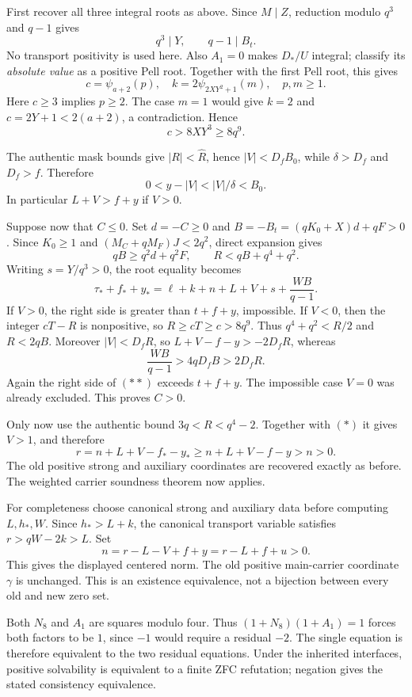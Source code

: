First recover all three integral roots as above.  Since $M\mid Z$,
reduction modulo $q^3$ and $q-1$ gives
\[
 q^3\mid Y,\qquad q-1\mid B_t.
\]
No transport positivity is used here.  Also $A_1=0$ makes $D_*/U$
integral; classify its \emph{absolute value} as a positive Pell root.
Together with the first Pell root, this gives
\[
 c=\psi_{a+2}(p),\quad k=2\psi_{2XY^2+1}(m),\quad p,m\ge1.
\]
Here $c\ge3$ implies $p\ge2$.  The case $m=1$ would give $k=2$ and
$c=2Y+1<2(a+2)$, a contradiction.  Hence
\[
 c>8XY^3\ge8q^9. \tag{*}
\]

The authentic mask bounds give $|R|<\widehat R$, hence
$|V|<D_fB_0$, while $\delta>D_f$ and $D_f>f$.  Therefore
\[
 0<y-|V|<|V|/\delta<B_0.
\]
In particular $L+V>f+y$ if $V>0$.

Suppose now that $C\le0$.  Set $d=-C\ge0$ and
$B=-B_t=(qK_0+X)d+qF>0$.  Since $K_0\ge1$ and
$(M_C+qM_F)J<2q^2$, direct expansion gives
\[
 qB\ge q^2d+q^2F,\qquad R<qB+q^4+q^2.
\]
Writing $s=Y/q^3>0$, the root equality becomes
\[
 \tau_*+f_*+y_*=
 \ell+k+n+L+V+s+\frac{WB}{q-1}. \tag{**}
\]
If $V>0$, the right side is greater than $t+f+y$, impossible.
If $V<0$, then the integer $cT-R$ is nonpositive, so
$R\ge cT\ge c>8q^9$.  Thus $q^4+q^2<R/2$ and $R<2qB$.
Moreover $|V|<D_fR$, so $L+V-f-y>-2D_fR$, whereas
\[
 \frac{WB}{q-1}>4qD_fB>2D_fR.
\]
Again the right side of $(**)$ exceeds $t+f+y$.
The impossible case $V=0$ was already excluded.  This proves $C>0$.

Only now use the authentic bound $3q<R<q^4-2$.
Together with $(*)$ it gives $V>1$, and therefore
\[
 r=n+L+V-f_*-y_*\ge n+L+V-f-y>n>0.
\]
The old positive strong and auxiliary coordinates are recovered exactly
as before.  The weighted carrier soundness theorem now applies.

For completeness choose canonical strong and auxiliary data before
computing $L,h_*,W$.  Since $h_*>L+k$, the canonical transport variable
satisfies $r>qW-2k>L$.  Set
\[
 n=r-L-V+f+y=r-L+f+u>0.
\]
This gives the displayed centered norm.  The old positive main-carrier
coordinate $\gamma$ is unchanged.  This is an existence equivalence,
not a bijection between every old and new zero set.

Both $N_8$ and $A_1$ are squares modulo four.  Thus
$(1+N_8)(1+A_1)=1$ forces both factors to be $1$, since $-1$ would
require a residual $-2$.  The single equation is therefore equivalent
to the two residual equations.  Under the inherited interfaces, positive
solvability is equivalent to a finite ZFC refutation; negation gives
the stated consistency equivalence.

